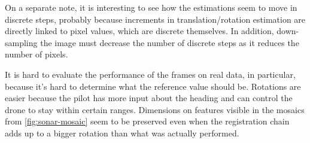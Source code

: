 On a separate note, it is interesting to see how the estimations seem to move in discrete steps, probably because increments in translation/rotation estimation are directly linked to pixel values, which are discrete themselves. In addition, down-sampling the image must decrease the number of discrete steps as it reduces the number of pixels. 

It is hard to evaluate the performance of the frames on real data, in particular, because it's hard to determine what the reference value should be. Rotations are easier because the pilot has more input about the heading and can control the drone to stay within certain ranges. Dimensions on features visible in the mosaics from \autoref{fig:sonar-mosaic} seem to be preserved even when the registration chain adds up to a bigger rotation than what was actually performed.